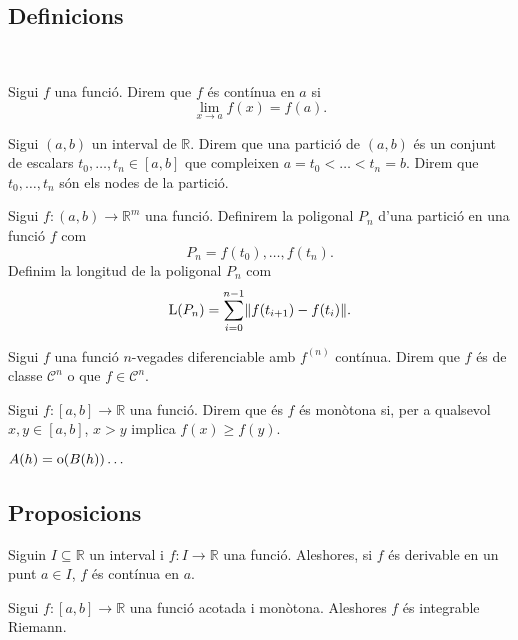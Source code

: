 \documentclass[../Apunts.tex]{subfiles}
\begin{document}
	\subsection{Definicions}
	\begin{definition}[Límit]
		\label{def:límit}\
	\end{definition}
	\begin{definition}
		\label{def:funcio continua}\label{def:funció contínua}
		Sigui \(f\) una funció. Direm que \(f\) és contínua en \(a\) si
		\[\lim_{x\to a}f(x)=f(a).\]
	\end{definition}
	\begin{definition}
		\label{def:partició}
		\label{def:poligonal}
		\label{def:longitud de poligonal}
		Sigui \((a,b)\) un interval de \(\mathbb{R}\). Direm que una partició de \((a,b)\) és un conjunt de escalars \(t_{0},\dots,t_{n}\in[a,b]\) que compleixen \(a=t_{0}<\dots<t_{n}=b\). Direm que \(t_{0},\dots,t_{n}\) són els nodes de la partició.
		
		Sigui \(f\colon(a,b)\to\mathbb{R}^{m}\) una funció. Definirem la poligonal \(P_{n}\) d'una partició en una funció \(f\) com
		\[P_{n}=f(t_{0}),\dots,f(t_{n}).\]
		Definim la longitud de la poligonal \(P_{n}\) com
		\[\Long(P_{n})=\sum_{i=0}^{n-1}\left\lVert f(t_{i+1})-f(t_{i})\right\rVert.\]
	\end{definition}
	\begin{definition}
		\label{def:Classe de diferenciabilitat}
		Sigui \(f\) una funció \(n\)-vegades diferenciable amb \(f^{(n)}\) contínua. Direm que \(f\) és de classe \(\mathcal{C}^{n}\) o que \(f\in\mathcal{C}^{n}\).
	\end{definition}
	\begin{definition}
		\label{def:funció monòtona}
		Sigui \(f\colon[a,b]\to\mathbb{R}\) una funció. Direm que és \(f\) és monòtona si, per a qualsevol \(x,y\in[a,b]\), \(x>y\) implica \(f(x)\geq f(y)\).
	\end{definition}
	\begin{definition}
		\label{def:Landau}
		\(A(h)=\operatorname{o}(B(h))\dots\)
	\end{definition}
	\subsection{Proposicions}
	\begin{proposition}\label{prop:Derivable implica contínua}
		Siguin \(I\subseteq\mathbb{R}\) un interval i \(f\colon I\to\mathbb{R}\) una funció. Aleshores, si \(f\) és derivable en un punt \(a\in I\), \(f\) és contínua en \(a\).
	\end{proposition}
	\begin{proposition}
		Sigui \(f\colon[a,b]\to\mathbb{R}\) una funció acotada i monòtona. Aleshores \(f\) és integrable Riemann.
	\end{proposition}
\end{document}
